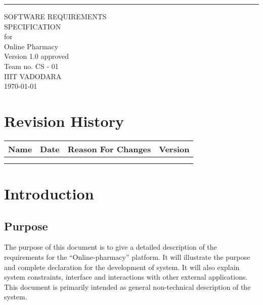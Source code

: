 \documentclass{scrreprt}
\date{}
\def\myversion{1.0 }
\begin{document}
\begin{flushright}
    \rule{16cm}{5pt}\vskip1cm
    \begin{bfseries}
        \Huge{SOFTWARE REQUIREMENTS\\ SPECIFICATION}\\
        \vspace{1.9cm}
        for\\
        \vspace{1.9cm}
        Online Pharmacy\\
        \vspace{1.9cm}
        \LARGE{Version \myversion approved}\\
        \vspace{1.9cm}
        Team no. CS - 01\\
        \vspace{1.9cm}
        IIIT VADODARA\\
        \vspace{1.9cm}
        \today\\
    \end{bfseries}
\end{flushright}

\tableofcontents


\chapter*{Revision History}

\begin{center}
    \begin{tabular}{|c|c|c|c|}
        \hline
	    Name & Date & Reason For Changes & Version\\
        \hline
	     &  &  & \\
        \hline
	     &  &  & \\
        \hline
    \end{tabular}
\end{center}

\chapter{Introduction}

\section{Purpose}
The purpose of this document is to give a detailed description of the requirements for the “Online-pharmacy” platform. It will illustrate the purpose and complete declaration for the development of system. It will also explain system constraints, interface and interactions with other external applications. This document is primarily intended as general non-technical description of the system. 
\end{document}
